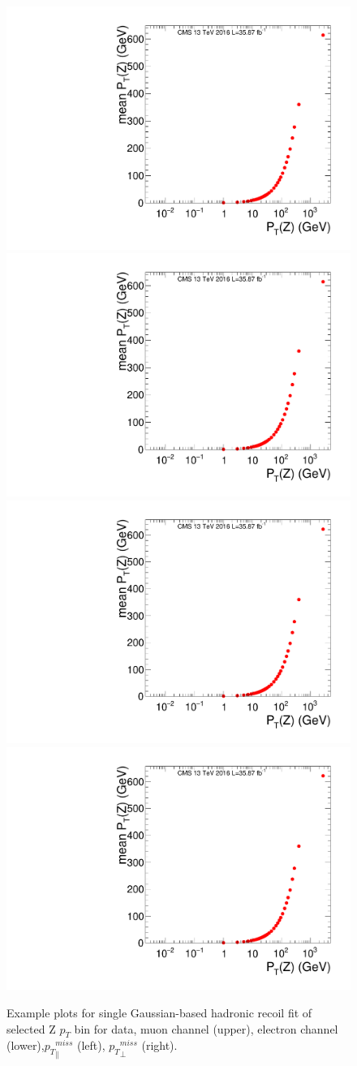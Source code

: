 \begin{figure}[htbp]
\begin{center}
\includegraphics[width=0.46\linewidth, page=21]{figures/SingleEMU_Run2016Full_03Feb2017_allcorV2_met_para_study_ZSelecLowLPt_mu.pdf}
\includegraphics[width=0.46\linewidth, page=56]{figures/SingleEMU_Run2016Full_03Feb2017_allcorV2_met_para_study_ZSelecLowLPt_mu.pdf}
\includegraphics[width=0.46\linewidth, page=21]{figures/SingleEMU_Run2016Full_03Feb2017_allcorV2_met_para_study_ZSelecLowLPt_el.pdf}
\includegraphics[width=0.46\linewidth, page=56]{figures/SingleEMU_Run2016Full_03Feb2017_allcorV2_met_para_study_ZSelecLowLPt_el.pdf}
\caption{Example plots for single Gaussian-based \ptmiss hadronic recoil fit of selected Z $p_T$ bin for \Zjets data, muon channel (upper), electron channel (lower),${p_{T}}^{miss}_\parallel$ (left), ${p_{T}}^{miss}_\perp$ (right).}
\label{fig:recoilfit_example_data}
\end{center}
\end{figure}


